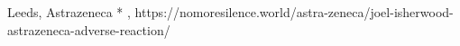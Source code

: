           {
            Leeds, 
          }
          {
          }
          {
            Astrazeneca
          }
          {
            *
          }
          {
            ,
          }
          {
            https://nomoresilence.world/astra-zeneca/joel-isherwood-astrazeneca-adverse-reaction/
          }

